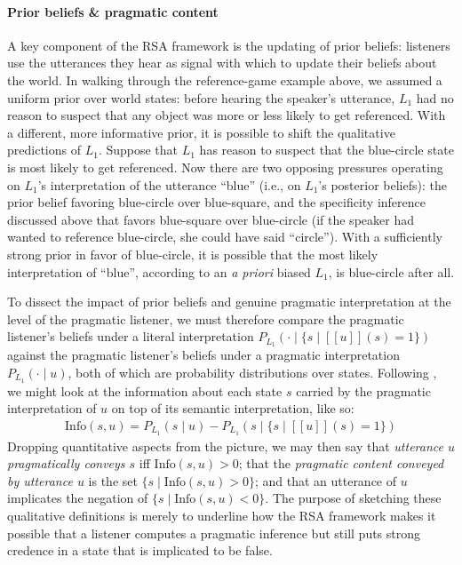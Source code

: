 \documentclass{sp}
\newcommand{\sem}[1]{\ensuremath{[\![#1]\!]}}
\begin{document}
\paragraph{Prior beliefs \& pragmatic content}
A key component of the RSA framework is the updating of prior beliefs: listeners use the utterances they hear as signal with which to update their beliefs about the world.
In walking through the reference-game example above, we assumed a uniform prior over world states: before hearing the speaker's utterance, $L_1$ had no reason to suspect that any object was more or less likely to get referenced.
With a different, more informative prior, it is possible to shift the qualitative predictions of $L_1$.
Suppose that $L_1$ has reason to suspect that the blue-circle state is most likely to get referenced.
Now there are two opposing pressures operating on $L_1$'s interpretation of the utterance ``blue'' (i.e., on $L_1$'s posterior beliefs): the prior belief favoring blue-circle over blue-square, and the specificity inference discussed above that favors blue-square over blue-circle (if the speaker had wanted to reference blue-circle, she could have said ``circle'').
With a sufficiently strong prior in favor of blue-circle, it is possible that the most likely interpretation of ``blue'', according to an \emph{a priori} biased $L_1$, is blue-circle after all.

To dissect the impact of prior beliefs and genuine pragmatic interpretation at the level of the pragmatic listener, we must therefore compare the pragmatic listener's beliefs under a literal interpretation $P_{L_{1}}(\cdot \mid \{s
\mid \sem {u}(s)=1\})$ against the pragmatic listener's beliefs under a pragmatic interpretation $P_{L_{1}}(\cdot \mid u)$, both of which are probability distributions over states.
Following \cite{Skyrms2010:Signals}, we might look at the information about each state $s$ carried by the pragmatic interpretation of $u$ on top of its semantic interpretation, like so:
\begin{align*}
  \text{Info}(s, u) = { P_{L_{1}}(s \mid u) }
  -
  { P_{L_{1}}(s \mid \{s \mid \sem{u}(s)=1\}) }
\end{align*}
Dropping quantitative aspects from the picture, we may then say that \emph{utterance $u$ pragmatically conveys $s$} iff $\text{Info}(s,u) > 0$; that the \emph{pragmatic content conveyed by utterance $u$} is the set $\{s \mid \text{Info}(s,u) > 0\}$; and that an utterance of $u$ implicates the negation of $\{s \mid \text{Info}(s,u) < 0\}$.
The purpose of sketching these qualitative definitions is merely to underline how the RSA framework makes it possible that a listener computes a pragmatic inference but still puts strong credence in a state that is implicated to be false.
\end{document}
